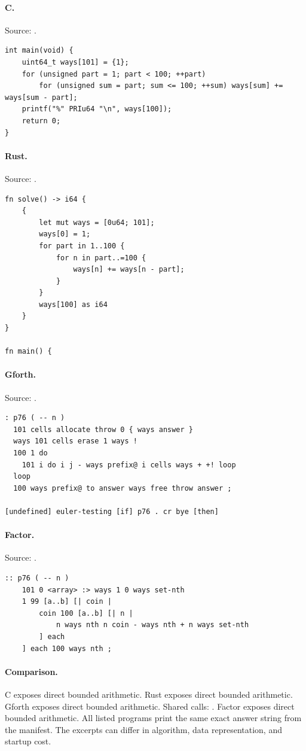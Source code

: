 \paragraph{C.} Source: .
\begin{lstlisting}
int main(void) {
    uint64_t ways[101] = {1};
    for (unsigned part = 1; part < 100; ++part)
        for (unsigned sum = part; sum <= 100; ++sum) ways[sum] += ways[sum - part];
    printf("%" PRIu64 "\n", ways[100]);
    return 0;
}
\end{lstlisting}

\paragraph{Rust.} Source: .
\begin{lstlisting}
fn solve() -> i64 {
    {
        let mut ways = [0u64; 101];
        ways[0] = 1;
        for part in 1..100 {
            for n in part..=100 {
                ways[n] += ways[n - part];
            }
        }
        ways[100] as i64
    }
}

fn main() {
\end{lstlisting}

\paragraph{Gforth.} Source: .
\begin{lstlisting}
: p76 ( -- n )
  101 cells allocate throw 0 { ways answer }
  ways 101 cells erase 1 ways !
  100 1 do
    101 i do i j - ways prefix@ i cells ways + +! loop
  loop
  100 ways prefix@ to answer ways free throw answer ;

[undefined] euler-testing [if] p76 . cr bye [then]
\end{lstlisting}

\paragraph{Factor.} Source: .
\begin{lstlisting}
:: p76 ( -- n )
    101 0 <array> :> ways 1 0 ways set-nth
    1 99 [a..b] [| coin |
        coin 100 [a..b] [| n |
            n ways nth n coin - ways nth + n ways set-nth
        ] each
    ] each 100 ways nth ;
\end{lstlisting}

\paragraph{Comparison.}
C exposes direct bounded arithmetic. Rust exposes direct bounded arithmetic. Gforth exposes direct bounded arithmetic. Shared calls: \texttt{}. Factor exposes direct bounded arithmetic.
All listed programs print the same exact answer string from the manifest. The excerpts can differ in algorithm, data representation, and startup cost.


